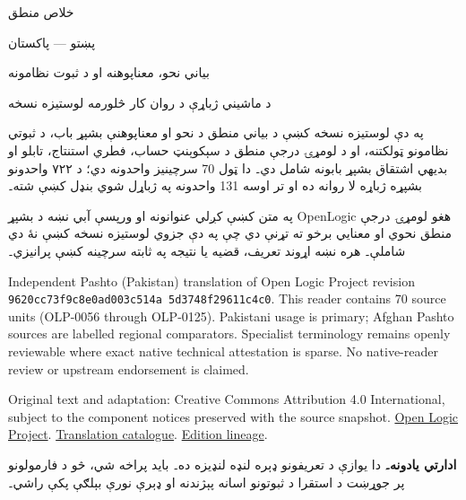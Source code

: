 \documentclass[12pt,a4paper,oneside]{report}
\theoremstyle{definition}
\newenvironment{editorial}{\begin{framed}\textbf{ادارتي يادونه۔}\enspace}{\end{framed}}
\begin{document}
\setRTL
\begin{titlepage}
\thispagestyle{empty}
\begin{center}
\vspace*{24mm}
{\Huge خلاص منطق}\par\bigskip
{\Large پښتو — پاکستان}\par\bigskip
{\LARGE بياني نحو، معناپوهنه او د ثبوت نظامونه}\par\bigskip
د ماشيني ژباړې د روان کار څلورمه لوستيزه نسخه
\end{center}
\bigskip
په دې لوستيزه نسخه کښې د بياني منطق د نحو او معناپوهنې بشپړ باب،
د ثبوتي نظامونو ټولکتنه، او د لومړۍ درجې منطق د سېکوېنټ حساب، فطري
استنتاج، تابلو او بديهي اشتقاق بشپړ بابونه شامل دي۔ دا ټول
70 سرچينيز واحدونه دي؛ د ۷۲۲ واحدونو بشپړه ژباړه لا
روانه ده او تر اوسه 131 واحدونه په ژباړل شوي بنډل کښې
شته۔

په متن کښې کږلي عنوانونه او ورپسې آبي \LR{\latinfont [OLP]} نښه د
بشپړ OpenLogic هغو لومړۍ درجې منطق نحوي او معنايي برخو ته تړنې دي چې
په دې جزوي لوستيزه نسخه کښې نۀ دي شاملې۔ هره نښه اړوند تعريف، قضيه
يا نتيجه په ثابته سرچينه کښې پرانيزي۔

\begin{LTR}\latinfont\small
Independent Pashto (Pakistan) translation of Open Logic Project revision
\texttt{9620cc73\allowbreak f9c8e0ad\allowbreak 003c514a\allowbreak
5d3748f2\allowbreak 9611c4c0}. This reader contains
70 source units (OLP-0056 through OLP-0125). Pakistani usage is
primary; Afghan Pashto sources are labelled regional comparators. Specialist
terminology remains openly reviewable where exact native technical attestation
is sparse. No native-reader review or upstream endorsement is claimed.

Original text and adaptation: Creative Commons Attribution 4.0 International,
subject to the component notices preserved with the source snapshot.
\href{https://openlogicproject.org/}{Open Logic Project}.\quad
\href{https://github.com/KokunoYumeto/OpenLogic-translations}{Translation catalogue}.\quad
\href{https://doi.org/10.5281/zenodo.22307197}{Edition lineage}.
\end{LTR}
\end{titlepage}
\tableofcontents
\clearpage


\label{olpseg:OLP-0056-B004:start}
\label{olpseg:OLP-0056-B004:end}

\label{olpseg:OLP-0056-B005:start}
\begin{editorial}
  دا يوازې د تعريفونو ډېره لنډه لنډيزه ده۔ بايد پراخه شي، څو د
  فارمولونو پر جوړښت د استقرا د ثبوتونو اسانه پېژندنه او ډېرې نورې
  بېلګې پکې راشي۔
\end{editorial}
\label{olpseg:OLP-0056-B005:end}
\end{document}
